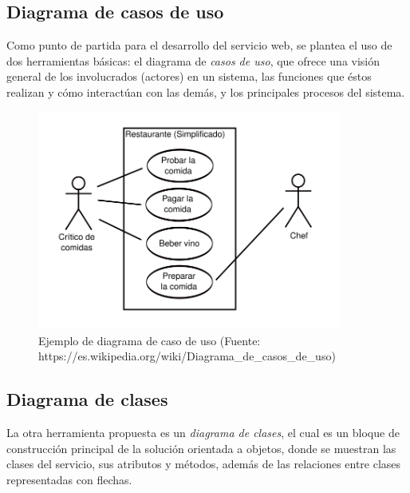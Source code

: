 \subsection{Diagrama de casos de uso}

Como punto de partida para el desarrollo del servicio web, se plantea el uso de dos herramientas básicas: el diagrama de \textit{casos de uso}, que ofrece una visión general de los involucrados (actores) en un sistema, las funciones que éstos realizan y cómo interactúan con las demás, y los principales procesos del sistema.\newline

\begin{figure}[!ht]
    \centering
    \includegraphics[width=10cm]{figures/diagrama_caso_de_uso.png} %
    \caption{Ejemplo de diagrama de caso de uso (Fuente: https://es.wikipedia.org/wiki/Diagrama_de_casos_de_uso)} %
    \label{diagrama_caso_de_uso}
\end{figure}

\subsection{Diagrama de clases}

La otra herramienta propuesta es un \textit{diagrama de clases}, el cual es un bloque de construcción principal de la solución orientada a objetos, donde se muestran las clases del servicio, sus atributos y métodos, además de las relaciones entre clases representadas con flechas.

